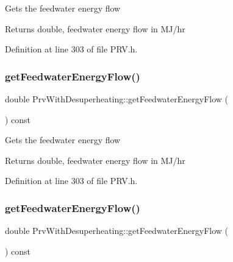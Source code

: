 Gets the feedwater energy flow \begin{DoxyReturn}{Returns}
double, feedwater energy flow in M\+J/hr 
\end{DoxyReturn}


Definition at line 303 of file P\+R\+V.\+h.

\mbox{\label{class_prv_with_desuperheating_a42945a77fcdbaf1e1844c444c696f8b0}} 
\subsubsection{\texorpdfstring{get\+Feedwater\+Energy\+Flow()}{getFeedwaterEnergyFlow()}\hspace{0.1cm}{\footnotesize\ttfamily [2/3]}}
{\footnotesize\ttfamily double Prv\+With\+Desuperheating\+::get\+Feedwater\+Energy\+Flow (\begin{DoxyParamCaption}{ }\end{DoxyParamCaption}) const\hspace{0.3cm}{\ttfamily [inline]}}

Gets the feedwater energy flow \begin{DoxyReturn}{Returns}
double, feedwater energy flow in M\+J/hr 
\end{DoxyReturn}


Definition at line 303 of file P\+R\+V.\+h.

\mbox{\label{class_prv_with_desuperheating_a42945a77fcdbaf1e1844c444c696f8b0}} 
\subsubsection{\texorpdfstring{get\+Feedwater\+Energy\+Flow()}{getFeedwaterEnergyFlow()}\hspace{0.1cm}{\footnotesize\ttfamily [3/3]}}
{\footnotesize\ttfamily double Prv\+With\+Desuperheating\+::get\+Feedwater\+Energy\+Flow (\begin{DoxyParamCaption}{ }\end{DoxyParamCaption}) const\hspace{0.3cm}{\ttfamily [inline]}}

